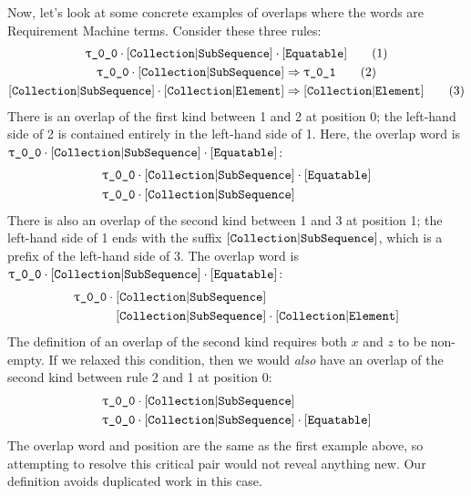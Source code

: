 \documentclass[../generics]{subfiles}
\begin{document}
\begin{example}

Now, let's look at some concrete examples of overlaps where the words are Requirement Machine terms. Consider these three rules:
\begin{gather*}
\rT\cdot\assocsym{Collection}{SubSequence}\cdot\protosym{Equatable}\tag{1}\\
\rT\cdot\assocsym{Collection}{SubSequence}\Red\rU\tag{2}\\
\assocsym{Collection}{SubSequence}\cdot\assocsym{Collection}{Element}\Red\assocsym{Collection}{Element}\tag{3}
\end{gather*}
There is an overlap of the first kind between 1 and 2 at position 0; the left-hand side of 2 is contained entirely in the left-hand side of 1. Here, the overlap word is $\rT\cdot\assocsym{Collection}{SubSequence}\cdot\protosym{Equatable}$:
\begin{align*}
&\rT\cdot\assocsym{Collection}{SubSequence}\cdot\protosym{Equatable}\\
&\rT\cdot\assocsym{Collection}{SubSequence}
\end{align*}
There is also an overlap of the second kind between 1 and 3 at position 1; the left-hand side of 1 ends with the suffix $[\texttt{Collection}|\texttt{SubSequence}]$, which is a prefix of the left-hand side of 3. The overlap word is $\rT\cdot\assocsym{Collection}{SubSequence}\cdot\protosym{Equatable}$:
\begin{align*}
\rT\cdot{}&\assocsym{Collection}{SubSequence}\\
&\assocsym{Collection}{SubSequence}\cdot\assocsym{Collection}{Element}
\end{align*}
The definition of an overlap of the second kind requires both $x$ and $z$ to be non-empty. If we relaxed this condition, then we would \emph{also} have an overlap of the second kind between rule 2 and 1 at position 0:
\begin{align*}
&\rT\cdot\assocsym{Collection}{SubSequence}\\
&\rT\cdot\assocsym{Collection}{SubSequence}\cdot\protosym{Equatable}
\end{align*}
The overlap word and position are the same as the first example above, so attempting to resolve this critical pair would not reveal anything new. Our definition avoids duplicated work in this case.
\end{example}
\end{document}
